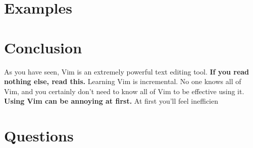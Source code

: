 \section{Examples}

\section{Conclusion}
As you have seen, Vim is an extremely powerful text editing tool. {\bf If
you read nothing else, read this.} Learning Vim is incremental. No one 
knows all of Vim, and you certainly don't need to know all of Vim to
be effective using it. {\bf Using Vim can be annoying at first.} At first
you'll feel inefficien

\section{Questions}


